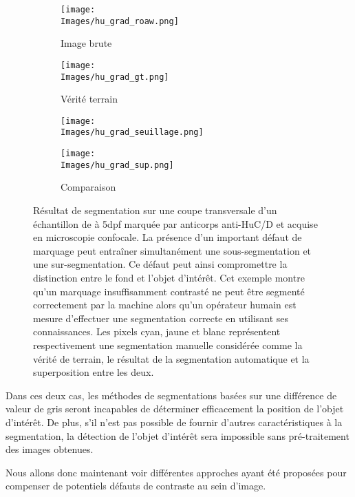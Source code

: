 \documentclass[\main/main.tex]{subfiles}
\providecommand{\Images}{\main/Figures/intro_seg}
\begin{document}
\begin{figure}[h!]
\begin{center}
    \begin{subfigure}[b]{0.2245\textwidth}
        \caption{
            \label{fig:apriori:raw}
        Image brute
            }
       \centering \texttt{[image: \\Images/hu\_grad\_roaw.png]}
    \end{subfigure}
    \begin{subfigure}[b]{0.2245\textwidth}
        \caption{
            \label{fig:apriori:gt}
        Vérité terrain
            }
       \centering \texttt{[image: \\Images/hu\_grad\_gt.png]}
    \end{subfigure}
    \begin{subfigure}[b]{0.2245\textwidth}
        \caption{
            \label{fig:apriori:seg}
            }
       \centering \texttt{[image: \\Images/hu\_grad\_seuillage.png]}
    \end{subfigure}
    \begin{subfigure}[b]{0.2245\textwidth}
        \caption{
            \label{fig:apriori:com}
            Comparaison
            }
       \centering \texttt{[image: \\Images/hu\_grad\_sup.png]}
    \end{subfigure}
    \caption{
        Résultat de segmentation sur une coupe transversale d'un échantillon de \pz{} à 5dpf marquée par anticorps anti\hyp{}HuC/D et acquise en microscopie confocale.
        \newline
        La présence d'un important défaut de marquage peut entraîner simultanément une sous-segmentation et une sur\hyp{}segmentation. Ce défaut peut ainsi compromettre la distinction entre le fond et l'objet d'intérêt.
        Cet exemple montre qu'un marquage insuffisamment contrasté ne peut être segmenté correctement par la machine alors qu'un opérateur humain est mesure d'effectuer une segmentation correcte en utilisant ses connaissances.
        \newline
        Les pixels cyan, jaune et blanc représentent respectivement une segmentation manuelle considérée comme la vérité de terrain,
        le résultat de la segmentation automatique et la superposition entre les deux.
    }
\end{center}
\end{figure}

Dans ces deux cas, les méthodes de segmentations basées sur une différence de valeur de gris seront incapables de déterminer efficacement la position de l'objet d'intérêt.
%
De plus, s'il n'est pas possible de fournir d'autres caractéristiques à la segmentation, la détection de l'objet d'intérêt sera impossible sans pré\hyp{}traitement des images obtenues.

%
Nous allons donc maintenant voir différentes approches ayant été proposées pour compenser de potentiels défauts de contraste au sein d'image.
\end{document}
